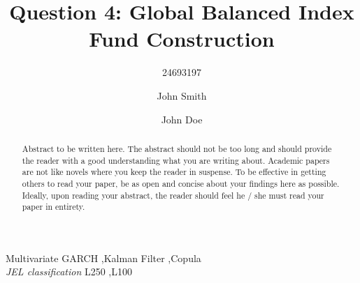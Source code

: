 \documentclass[11pt,preprint]{elsarticle}
\numberwithin{equation}{section}
\numberwithin{figure}{section}
\numberwithin{table}{section}
\begin{document}
\begin{frontmatter}  %

\title{Question 4: Global Balanced Index Fund Construction}





\author[Add1]{24693197}

\author[Add1,Add2]{John Smith}

\author[Add1,Add2]{John Doe}



\address[Add1]{Stellenbosch University, Stellenbosch, South Africa}
\address[Add2]{Some other Institution, Cape Town, South Africa}


\begin{abstract}
\small{
Abstract to be written here. The abstract should not be too long and
should provide the reader with a good understanding what you are writing
about. Academic papers are not like novels where you keep the reader in
suspense. To be effective in getting others to read your paper, be as
open and concise about your findings here as possible. Ideally, upon
reading your abstract, the reader should feel he / she must read your
paper in entirety.
}
\end{abstract}

\vspace{1cm}


\begin{keyword}
\footnotesize{
Multivariate GARCH \sep Kalman Filter \sep Copula \\
\vspace{0.3cm}
}
\footnotesize{
\textit{JEL classification} L250 \sep L100
}
\end{keyword}



\vspace{0.5cm}

\end{frontmatter}

\setcounter{footnote}{0}



\pagestyle{fancy}
\chead{}
\rhead{}
\lfoot{}
\lhead{}
\cfoot{}
\end{document}
